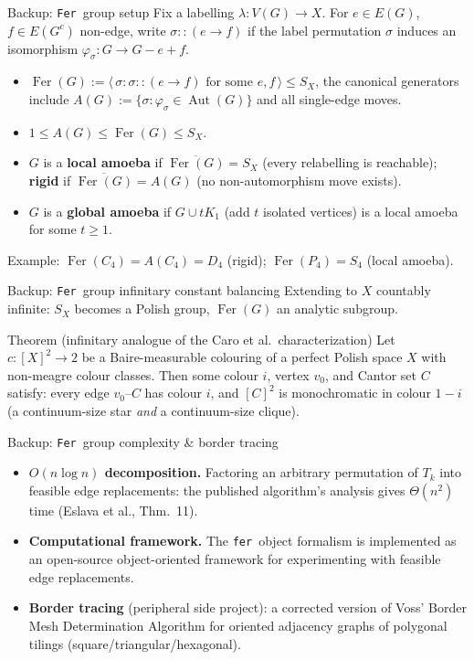 \documentclass[aspectratio=169]{beamer}
\DeclareMathOperator{\Fer}{Fer}
\DeclareMathOperator{\Aut}{Aut}
\newcommand{\tFer}{\texttt{Fer}\ }
\newcommand{\tfer}{\texttt{fer}\ }
\begin{document}
\begin{frame}{Backup: \tFer group setup}
  Fix a labelling $\lambda\colon V(G)\to X$. For $e\in E(G)$, $f\in E(G^c)$ non-edge, write $\sigma::(e\to f)$ if the label permutation $\sigma$ induces an isomorphism $\varphi_\sigma\colon G\to G-e+f$.
  \begin{itemize}
    \item $\Fer(G) := \langle\, \sigma : \sigma::(e\to f) \text{ for some } e,f \,\rangle \leq S_X$, the \alert{canonical generators} include $A(G):=\{\sigma:\varphi_\sigma\in\Aut(G)\}$ and all single-edge moves.
    \item $1 \leq A(G) \leq \Fer(G) \leq S_X$.
    \item $G$ is a \textbf{local amoeba} if $\overline{\Fer(G)}=S_X$ (every relabelling is reachable); \textbf{rigid} if $\overline{\Fer(G)}=A(G)$ (no non-automorphism move exists).
    \item $G$ is a \textbf{global amoeba} if $G\cup tK_1$ (add $t$ isolated vertices) is a local amoeba for some $t\geq 1$.
  \end{itemize}
  Example: $\Fer(C_4)=A(C_4)=D_4$ (rigid); $\Fer(P_4)=S_4$ (local amoeba).
\end{frame}

\begin{frame}{Backup: \tFer group infinitary constant balancing}
  Extending to $X$ countably infinite: $S_X$ becomes a Polish group, $\Fer(G)$ an analytic subgroup.
  \begin{block}{Theorem (infinitary analogue of the Caro et al.\ characterization)}
    Let $c\colon[X]^2\to 2$ be a Baire-measurable colouring of a perfect Polish space $X$ with non-meagre colour classes. Then some colour $i$, vertex $v_0$, and Cantor set $C$ satisfy: every edge $v_0$--$C$ has colour $i$, and $[C]^2$ is monochromatic in colour $1-i$ (a continuum-size star \emph{and} a continuum-size clique).
  \end{block}
\end{frame}

\begin{frame}{Backup: \tFer group complexity \& border tracing}
  \begin{itemize}
    \item \textbf{$O(n\log n)$ decomposition.} Factoring an arbitrary permutation of $T_k$ into feasible edge replacements: the published algorithm's analysis gives $\Theta(n^2)$ time (Eslava et al., Thm.~11).
    \item \textbf{Computational framework.} The \tfer object formalism is implemented as an open-source object-oriented framework for experimenting with feasible edge replacements.
    \item \textbf{Border tracing} (peripheral side project): a corrected version of Voss' Border Mesh Determination Algorithm for oriented adjacency graphs of polygonal tilings (square/triangular/hexagonal).
  \end{itemize}
\end{frame}
\end{document}
